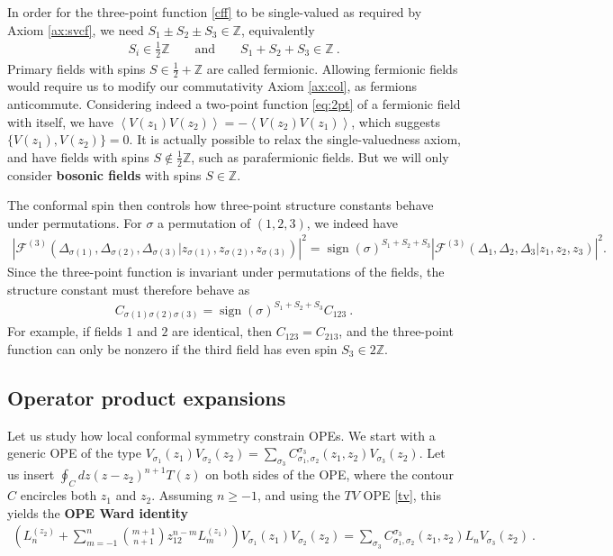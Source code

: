 \documentclass[12pt, a4paper, notitlepage, twoside]{report}
\numberwithin{equation}{section}
\theoremstyle{break}
\begin{document}
In order for the three-point function \eqref{cff} to be single-valued as required by Axiom \ref{ax:svcf}, we need $S_1\pm S_2\pm S_3 \in\mathbb{Z}$, equivalently
\begin{align}
 \boxed{S_i \in \frac12{\mathbb{Z}} \qquad \text{and} \qquad S_1+S_2+S_3\in\mathbb{Z}}\ .
\label{dbdz}
\end{align}
Primary fields with spins $S\in\frac12+\mathbb{Z}$ are called fermionic. Allowing fermionic fields would require us to modify our commutativity Axiom \ref{ax:col}, as fermions anticommute. Considering indeed a two-point function \eqref{eq:2pt} of a fermionic field with itself, we have $\left< V(z_1)V(z_2)\right> = -\left<V(z_2)V(z_1)\right>$, which suggests $\{V(z_1),V(z_2)\}=0$.
It is actually possible to relax the single-valuedness axiom, and have fields with spins $S\notin \frac12\mathbb{Z}$, such as parafermionic fields. But we will only consider \textbf{bosonic fields} with spins $S\in\mathbb{Z}$.

The conformal spin then controls how three-point structure constants behave under permutations. For $\sigma$ a permutation of $(1,2,3)$, we indeed have 
\begin{align}
 \left|\mathcal{F}^{(3)}(\Delta_{\sigma(1)},\Delta_{\sigma(2)},\Delta_{\sigma(3)}|z_{\sigma(1)},z_{\sigma(2)},z_{\sigma(3)})\right|^2 = \operatorname{sign}(\sigma)^{S_1+S_2+S_3} \left|\mathcal{F}^{(3)}(\Delta_1,\Delta_2,\Delta_3|z_1,z_2,z_3)\right|^2 .
\end{align}
Since the three-point function is invariant under permutations of the fields, the structure constant must therefore behave as 
\begin{align}
 \boxed{ C_{\sigma(1)\sigma(2)\sigma(3)} = \operatorname{sign}(\sigma)^{S_1+S_2+S_3} C_{123} }\ .
 \label{css}
\end{align}
For example, if fields $1$ and $2$ are identical, then $C_{123}=C_{213}$, and the three-point function can only be nonzero if the third field has even spin $S_3\in 2\mathbb{Z}$.


\subsection{Operator product expansions \label{secope}}

Let us study how local conformal symmetry constrain OPEs. We start with a generic OPE of the type $V_{\sigma_1}(z_1)V_{\sigma_2}(z_2) = \sum_{\sigma_3} C_{\sigma_1,\sigma_2}^{\sigma_3}(z_1,z_2) V_{\sigma_3}(z_2)$. Let us insert $\oint_C dz (z-z_2)^{n+1} T(z)$ on both sides of the OPE, where the contour $C$ encircles both $z_1$ and $z_2$. Assuming $n\geq -1$, and using the $TV$ OPE \eqref{tv}, this yields the \textbf{OPE Ward identity}
\begin{align}
 \left(L_n^{(z_2)}+\sum_{m=-1}^{n}\binom{m+1}{n+1} z_{12}^{n-m}L_{m}^{(z_1)}\right)V_{\sigma_1}(z_1)V_{\sigma_2}(z_2) = \sum_{\sigma_3} C_{\sigma_1,\sigma_2}^{\sigma_3}(z_1,z_2) L_n V_{\sigma_3}(z_2)\ .
\end{align}
\end{document}
